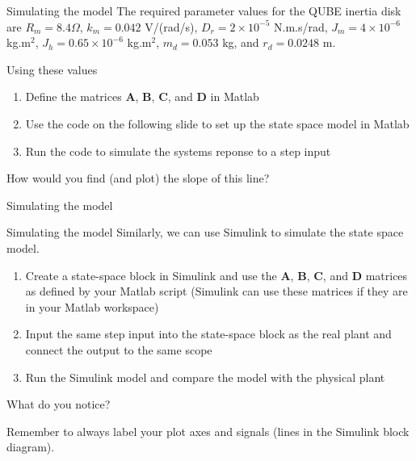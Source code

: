 \documentclass[9pt]{beamer-control}
\begin{document}
\begin{frame}{Simulating the model}
The required parameter values for the QUBE inertia disk are $R_m=8.4\Omega$, $k_m=0.042$ V/(rad/s), $D_r=2\times 10^{-5}$ N.m.s/rad, $J_m = 4\times 10^{-6}$ kg.m$^2$, $J_h = 0.65 \times 10^{-6}$ kg.m$^2$, $m_d=0.053$ kg, and $r_d = 0.0248$ m.

Using these values
\begin{enumerate}
	\item Define the matrices $\mathbf{A}$, $\mathbf{B}$, $\mathbf{C}$, and $\mathbf{D}$ in Matlab
	\item Use the code on the following slide to set up the state space model in Matlab
	\item Run the code to simulate the systems reponse to a step input
\end{enumerate}

How would you find (and plot) the slope of this line?


\end{frame}

\begin{frame}{Simulating the model}
\end{frame}


\begin{frame}{Simulating the model}
Similarly, we can use Simulink to simulate the state space model.
\begin{enumerate}
	\item Create a state-space block in Simulink and use the $\mathbf{A}$, $\mathbf{B}$, $\mathbf{C}$, and $\mathbf{D}$ matrices as defined by your Matlab script (Simulink can use these matrices if they are in your Matlab workspace)
	\item Input the same step input into the state-space block as the real plant and connect the output to the same scope
	\item Run the Simulink model and compare the model with the physical plant
\end{enumerate}

What do you notice?

Remember to always label your plot axes and signals (lines in the Simulink block diagram).


\end{frame}
\end{document}

